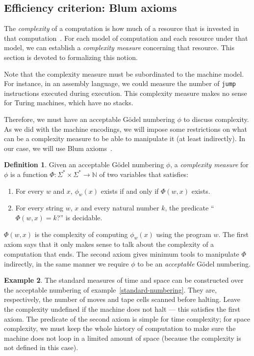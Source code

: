 \documentclass[12pt]{article}
\theoremstyle{definition}
\newtheorem{definition}{Definition}
\newtheorem{example}[definition]{Example}
\begin{document}
\subsection{Efficiency criterion: Blum axioms}
\label{sec:blum-axioms}

The \emph{complexity} of a computation is how much of a resource
that is invested in that computation~\cite[p.~285]{HopcroftUllman1979}.
For each model of computation and each resource under that model,
we can establish a \emph{complexity measure} concerning that resource.
This section is devoted to formalizing this notion.

Note that the complexity measure must be subordinated to the machine model.
For instance,
in an assembly language,
we could measure the number of \texttt{jump} instructions executed during execution.
This complexity measure makes no sense for Turing machines,
which have no stacks.

Therefore,
we must have an acceptable Gödel numbering $\phi$
to discuss complexity.
As we did with the machine encodings,
we will impose some restrictions on what can be a complexity measure
to be able to manipulate it (at least indirectly).
In our case,
we will use Blum axioms~\cite[p.~324]{Blum1967}.

\begin{definition}
    Given an acceptable Gödel numbering $\phi$,
    a \emph{complexity measure} for $\phi$
    is a function $\Phi:\Sigma^* \times \Sigma^* \to \mathbb N$ of two variables
    that satisfies: \cite[p.~324]{Blum1967}
    \begin{enumerate}
        \item For every $w$ and $x$,
            $\phi_w(x)$ exists if and only if $\Phi(w, x)$ exists.
        \item For every string $w$, $x$ and every natural number $k$,
            the predicate ``$\Phi(w, x) = k$?'' is decidable.
    \end{enumerate}
\end{definition}

$\Phi(w, x)$ is the complexity of computing $\phi_w(x)$
using the program $w$.
The first axiom says that it only makes sense
to talk about the complexity of a computation that ends.
The second axiom gives minimum tools to manipulate $\Phi$ indirectly,
in the same manner we require $\phi$ to be an \emph{acceptable} Gödel numbering.

\begin{example}
    The standard measures of time and space can be constructed
    over the acceptable numbering of example~\ref{standard-numbering}.
    They are, respectively,
    the number of moves and tape cells scanned
    before halting.
    Leave the complexity undefined if the machine does not halt
    --- this satisfies the first axiom.
    The predicate of the second axiom is simple for time complexity;
    for space complexity,
    we must keep the whole history of computation
    to make sure the machine does not loop in a limited amount of space
    (because the complexity is not defined in this case).
\end{example}
\end{document}
